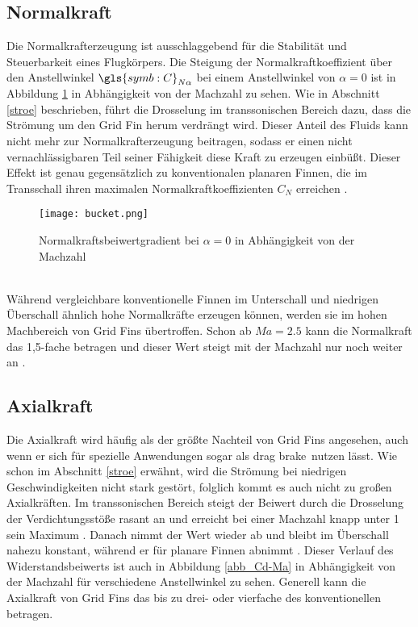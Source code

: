 \subsection{Normalkraft}
Die Normalkrafterzeugung ist ausschlaggebend für die Stabilität und Steuerbarkeit eines Flugkörpers. Die Steigung der Normalkraftkoeffizient über den Anstellwinkel $\gls{symb:C}_{N\alpha}$ bei einem Anstellwinkel von $\alpha = 0$ ist in Abbildung \ref{abb_bucket} in Abhängigkeit von der Machzahl zu sehen. Wie in Abschnitt \ref{stroe} beschrieben, führt die Drosselung im transsonischen Bereich dazu, dass die Strömung um den Grid Fin herum verdrängt wird. Dieser Anteil des Fluids kann nicht mehr zur Normalkrafterzeugung beitragen, sodass er einen nicht vernachlässigbaren Teil seiner Fähigkeit diese Kraft zu erzeugen einbüßt. Dieser Effekt ist genau gegensätzlich zu konventionalen planaren Finnen, die im Transschall ihren maximalen Normalkraftkoeffizienten $C_N$ erreichen \cite{synopsis}.
\begin{figure}[h]
	\centering
	\texttt{[image: bucket.png]}
	\begin{flushright}
	\end{flushright}
	\caption{Normalkraftsbeiwertgradient bei $\alpha = 0$ in Abhängigkeit von der Machzahl}
	\label{abb_bucket}
\end{figure}\\
Während vergleichbare konventionelle Finnen im Unterschall und niedrigen Überschall ähnlich hohe Normalkräfte erzeugen können, werden sie im hohen Machbereich von Grid Fins übertroffen. Schon ab $Ma=2.5$ kann die Normalkraft das 1,5-fache betragen und dieser Wert steigt mit der Machzahl nur noch weiter an \cite{synopsis,vergleichPlanarNATO}.
\subsection{Axialkraft}
Die Axialkraft wird häufig als der größte Nachteil von Grid Fins angesehen, auch wenn er sich für spezielle Anwendungen sogar als \grqq drag brake\grqq \ nutzen lässt. Wie schon im Abschnitt \ref{stroe} erwähnt, wird die Strömung bei niedrigen Geschwindigkeiten nicht stark gestört, folglich kommt es auch nicht zu großen Axialkräften. Im transsonischen Bereich steigt der Beiwert durch die Drosselung der Verdichtungsstöße rasant an und erreicht bei einer Machzahl knapp unter 1 sein Maximum \cite{solver}. Danach nimmt der Wert wieder ab und bleibt im Überschall nahezu konstant, während er für planare Finnen abnimmt \cite{vergleichPlanarNATO}. Dieser Verlauf des Widerstandsbeiwerts ist auch in Abbildung \ref{abb_Cd-Ma} in Abhängigkeit von der Machzahl für verschiedene Anstellwinkel zu sehen. Generell kann die Axialkraft von Grid Fins das bis zu drei- oder  vierfache des konventionellen betragen.
